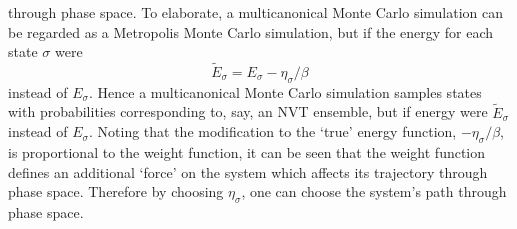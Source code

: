 \documentclass{report}
\begin{document}
through phase space. To elaborate, a multicanonical Monte Carlo simulation can be regarded as a Metropolis Monte Carlo 
simulation, but if the energy for each state $\sigma$ were 
\begin{equation}
\tilde{E}_{\sigma}=E_{\sigma}-\eta_{\sigma}/\beta
\end{equation}
instead of $E_{\sigma}$. Hence a multicanonical Monte Carlo simulation samples states with probabilities corresponding to, say, an NVT ensemble,
but if energy were $\tilde{E}_{\sigma}$ instead of $E_{\sigma}$. Noting that the modification to the `true' energy function, $-\eta_{\sigma}/\beta$, is
proportional to the weight function, it can be seen that the weight function defines an additional `force' on the system which affects its
trajectory through phase space. Therefore by choosing $\eta_{\sigma}$, one can choose the system's path through phase space. 
\end{document}
